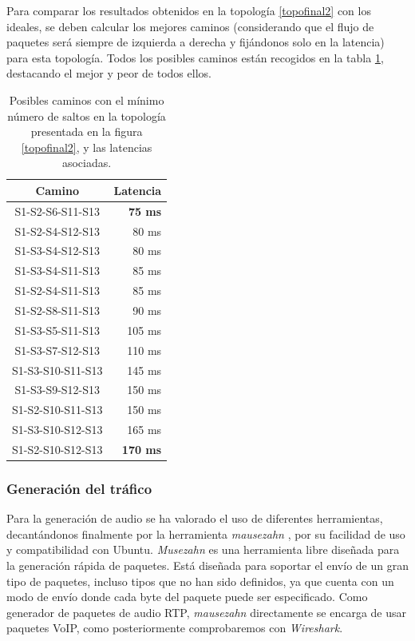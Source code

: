 \documentclass[a4paper,11pt]{book}
\begin{document}
Para comparar los resultados obtenidos en la topología \ref{topofinal2} con los ideales, se deben calcular los mejores caminos (considerando que el flujo de paquetes será siempre de izquierda a derecha y fijándonos solo en la latencia) para esta topología. Todos los posibles caminos están recogidos en la tabla \ref{bestPath2}, destacando el mejor y peor de todos ellos.
\begin{table}[htb]
\centering
\begin{tabular}{|c|r|}
\hline
{\bf Camino}      & {\bf Latencia} \\ \hline
S1-S2-S6-S11-S13  & \textbf{75 ms}          \\ \hline
S1-S2-S4-S12-S13  & 80 ms          \\ \hline
S1-S3-S4-S12-S13  & 80 ms          \\ \hline
S1-S3-S4-S11-S13  & 85 ms          \\ \hline
S1-S2-S4-S11-S13  & 85 ms          \\ \hline
S1-S2-S8-S11-S13  & 90 ms          \\ \hline
S1-S3-S5-S11-S13  & 105 ms         \\ \hline
S1-S3-S7-S12-S13  & 110 ms         \\ \hline
S1-S3-S10-S11-S13 & 145 ms         \\ \hline
S1-S3-S9-S12-S13  & 150 ms         \\ \hline
S1-S2-S10-S11-S13 & 150 ms         \\ \hline
S1-S3-S10-S12-S13 & 165 ms         \\ \hline
S1-S2-S10-S12-S13 & \textbf{170 ms}         \\ \hline
\end{tabular}
\caption[Caminos y latencias topología \ref{topofinal2}]{Posibles caminos con el mínimo número de saltos en la topología presentada en la figura \ref{topofinal2}, y las latencias asociadas.}
\label{bestPath2}
\end{table}


\subsubsection{Generación del tráfico}

Para la generación de audio se ha valorado el uso de diferentes herramientas, decantándonos finalmente por la herramienta \textit{mausezahn} \cite{mausezahn}, por su facilidad de uso y compatibilidad con Ubuntu. \textit{Musezahn} es una herramienta libre diseñada para la generación rápida de paquetes. Está diseñada para soportar el envío de un gran tipo de paquetes, incluso tipos que no han sido definidos, ya que cuenta con un modo de envío donde cada byte del paquete puede ser especificado. Como generador de paquetes de audio \ac{RTP}, \textit{mausezahn} directamente se encarga de usar paquetes \ac{VoIP}, como posteriormente comprobaremos con \emph{Wireshark}.
\end{document}
